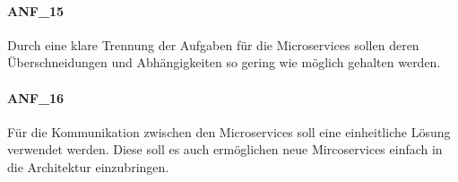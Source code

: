 \paragraph{ANF\_15}
\label{ANF_15}
Durch eine klare Trennung der Aufgaben für die Microservices sollen deren Überschneidungen und Abhängigkeiten so gering wie möglich gehalten werden.

\paragraph{ANF\_16}
\label{ANF_16}
Für die Kommunikation zwischen den Microservices soll eine einheitliche Lösung verwendet werden.
Diese soll es auch ermöglichen neue Mircoservices einfach in die Architektur einzubringen.

